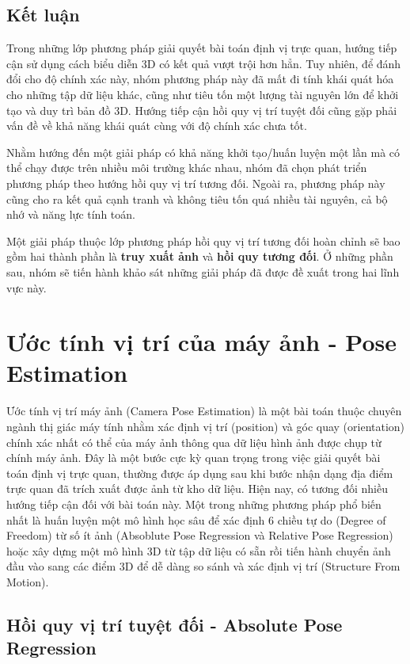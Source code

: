 \subsection{Kết luận}
Trong những lớp phương pháp giải quyết bài toán định vị trực quan, hướng tiếp cận sử dụng cách biểu diễn 3D có kết quả vượt trội hơn hẳn. Tuy nhiên, để đánh đổi cho độ chính xác này, nhóm phương pháp này đã mất đi tính khái quát hóa cho những tập dữ liệu khác, cũng như tiêu tốn một lượng tài nguyên lớn để khởi tạo và duy trì bản đồ 3D. Hướng tiếp cận hồi quy vị trí tuyệt đối cũng gặp phải vấn đề về khả năng khái quát cùng với độ chính xác chưa tốt.

Nhằm hướng đến một giải pháp có khả năng khởi tạo/huấn luyện một lần mà có thể chạy được trên nhiều môi trường khác nhau, nhóm đã chọn phát triển phương pháp theo hướng hồi quy vị trí tương đối. Ngoài ra, phương pháp này cũng cho ra kết quả cạnh tranh và không tiêu tốn quá nhiều tài nguyên, cả bộ nhớ và năng lực tính toán.

Một giải pháp thuộc lớp phương pháp hồi quy vị trí tương đối hoàn chỉnh sẽ bao gồm hai thành phần là \textbf{truy xuất ảnh} và \textbf{hồi quy tương đối}. Ở những phần sau, nhóm sẽ tiến hành khảo sát những giải pháp đã được đề xuất trong hai lĩnh vực này.




\section{Ước tính vị trí của máy ảnh - Pose Estimation}

Ước tính vị trí máy ảnh (Camera Pose Estimation) là một bài toán thuộc chuyên ngành thị giác máy tính nhằm xác định vị trí (position) và góc quay (orientation) chính xác nhất có thể của máy ảnh thông qua dữ liệu hình ảnh được chụp từ chính máy ảnh. Đây là một bước cực kỳ quan trọng trong việc giải quyết bài toán định vị trực quan, thường được áp dụng sau khi bước nhận dạng địa điểm trực quan đã trích xuất được ảnh từ kho dữ liệu. Hiện nay, có tương đối nhiều hướng tiếp cận đối với bài toán này. Một trong những phương pháp phổ biến nhất là huấn luyện một mô hình học sâu để xác định 6 chiều tự do (Degree of Freedom) từ số ít ảnh (Absoblute Pose Regression và Relative Pose Regression) hoặc xây dựng một mô hình 3D từ tập dữ liệu có sẵn rồi tiến hành chuyển ảnh đầu vào sang các điểm 3D để dễ dàng so sánh và xác định vị trí (Structure From Motion).

\subsection{Hồi quy vị trí tuyệt đối - Absolute Pose Regression}

